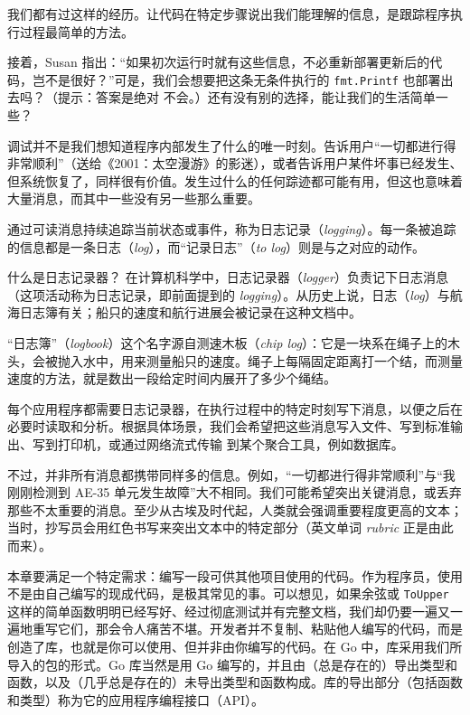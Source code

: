 我们都有过这样的经历。让代码在特定步骤说出我们能理解的信息，是跟踪程序执行过程最简单的方法。

接着，Susan 指出：“如果初次运行时就有这些信息，不必重新部署更新后的代码，岂不是很好？”可是，我们会想要把这条无条件执行的 \texttt{fmt.Printf} 也部署出去吗？（提示：答案是绝对
不会。）还有没有别的选择，能让我们的生活简单一些？

调试并不是我们想知道程序内部发生了什么的唯一时刻。告诉用户“一切都进行得非常顺利”（送给《2001：太空漫游》的影迷），或者告诉用户某件坏事已经发生、但系统恢复了，同样很有价值。发生过什么的任何踪迹都可能有用，但这也意味着大量消息，而其中一些没有另一些那么重要。

通过可读消息持续追踪当前状态或事件，称为日志记录（\emph{logging}）。每一条被追踪的信息都是一条日志（\emph{log}），而“记录日志”（\emph{to log}）则是与之对应的动作。

\begin{infobox}{什么是日志记录器？}
在计算机科学中，日志记录器（\emph{logger}）负责记下日志消息（这项活动称为日志记录，即前面提到的 \emph{logging}）。从历史上说，日志（\emph{log}）与航海日志簿有关；船只的速度和航行进展会被记录在这种文档中。

“日志簿”（\emph{logbook}）这个名字源自测速木板（\emph{chip log}）：它是一块系在绳子上的木头，会被抛入水中，用来测量船只的速度。绳子上每隔固定距离打一个结，而测量速度的方法，就是数出一段给定时间内展开了多少个绳结。
\end{infobox}

每个应用程序都需要日志记录器，在执行过程中的特定时刻写下消息，以便之后在必要时读取和分析。根据具体场景，我们会希望把这些消息写入文件、写到标准输出、写到打印机，或通过网络流式传输
到某个聚合工具，例如数据库。

不过，并非所有消息都携带同样多的信息。例如，“一切都进行得非常顺利”与“我刚刚检测到 AE-35 单元发生故障”大不相同。我们可能希望突出关键消息，或丢弃那些不太重要的消息。至少从古埃及时代起，人类就会强调重要程度更高的文本；当时，抄写员会用红色书写来突出文本中的特定部分（英文单词 \emph{rubric} 正是由此而来）。

本章要满足一个特定需求：编写一段可供其他项目使用的代码。作为程序员，使用不是由自己编写的现成代码，是极其常见的事。可以想见，如果余弦或 \texttt{ToUpper} 这样的简单函数明明已经写好、经过彻底测试并有完整文档，我们却仍要一遍又一遍地重写它们，那会令人痛苦不堪。开发者并不复制、粘贴他人编写的代码，而是创造了库，也就是你可以使用、但并非由你编写的代码。在 Go 中，库采用我们所导入的包的形式。Go 库当然是用 Go 编写的，并且由（总是存在的）导出类型和函数，以及（几乎总是存在的）未导出类型和函数构成。库的导出部分（包括函数和类型）称为它的应用程序编程接口（API）。

